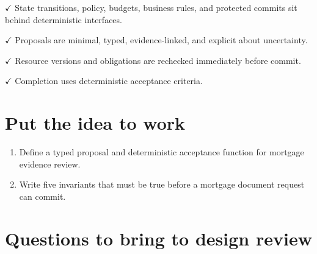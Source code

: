 \textbf{\ensuremath{\checkmark}} State transitions, policy, budgets, business rules, and protected commits sit behind deterministic interfaces.\par

\textbf{\ensuremath{\checkmark}} Proposals are minimal, typed, evidence-linked, and explicit about uncertainty.\par

\textbf{\ensuremath{\checkmark}} Resource versions and obligations are rechecked immediately before commit.\par

\textbf{\ensuremath{\checkmark}} Completion uses deterministic acceptance criteria.\par

\section{Put the idea to work}

\begin{enumerate}

\item Define a typed proposal and deterministic acceptance function for mortgage evidence review.

\item Write five invariants that must be true before a mortgage document request can commit.

\end{enumerate}

\section{Questions to bring to design review}

